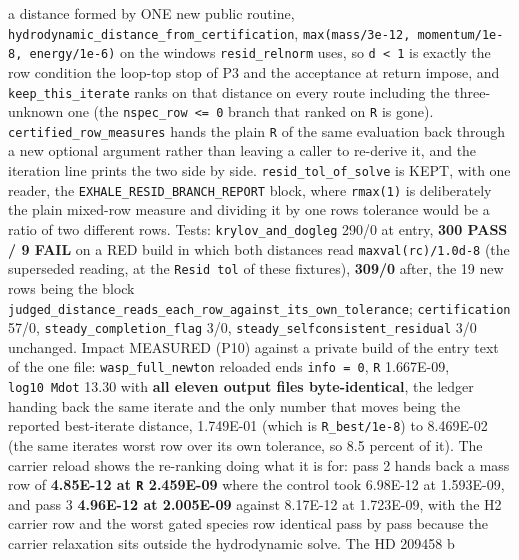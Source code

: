 \documentclass[english,a4paper]{my_memo}
\begin{document}
\begin{itemize}
  a distance formed by ONE new public routine,
  \texttt{hydrodynamic\_distance\_from\_certification}, \texttt{max(mass/3e-12,\ momentum/1e-8,\ energy/1e-6)} on the windows \texttt{resid\_relnorm} uses, so \texttt{d\ \textless{}\ 1} is exactly the
  row condition the loop-top stop of P3 and the acceptance at return impose,
  and \texttt{keep\_this\_iterate} ranks on that distance on every route including the
  three-unknown one (the \texttt{nspec\_row\ \textless{}=\ 0} branch that ranked on \texttt{\textbar{}\textbar{}R\textbar{}\textbar{}} is
  gone). \texttt{certified\_row\_measures} hands the plain \texttt{\textbar{}\textbar{}R\textbar{}\textbar{}} of the same
  evaluation back through a new optional argument rather than leaving a caller
  to re-derive it, and the iteration line prints the two side by side.
  \texttt{resid\_tol\_of\_solve} is KEPT, with one reader, the
  \texttt{EXHALE\_RESID\_BRANCH\_REPORT} block, where \texttt{rmax(1)} is deliberately the
  plain mixed-row measure and dividing it by one row\textquotesingle s tolerance would be a
  ratio of two different rows. Tests: \texttt{krylov\_and\_dogleg} 290/0 at entry,
  \textbf{300 PASS / 9 FAIL} on a RED build in which both distances read
  \texttt{maxval(rc)/1.0d-8} (the superseded reading, at the \texttt{Resid\ tol} of these
  fixtures), \textbf{309/0} after, the 19 new rows being the block
  \texttt{judged\_distance\_reads\_each\_row\_against\_its\_own\_tolerance}; \texttt{certification}
  57/0, \texttt{steady\_completion\_flag} 3/0, \texttt{steady\_selfconsistent\_residual} 3/0
  unchanged. Impact MEASURED (P10) against a private build of the entry text
  of the one file: \texttt{wasp\_full\_newton} reloaded ends \texttt{info\ =\ 0}, \texttt{\textbar{}\textbar{}R\textbar{}\textbar{}}
  1.667E-09, \texttt{log10\ Mdot} 13.30 with \textbf{all eleven output files
  byte-identical}, the ledger handing back the same iterate and the only
  number that moves being the reported best-iterate distance, 1.749E-01
  (which is \texttt{\textbar{}\textbar{}R\textbar{}\textbar{}\_best/1e-8}) to 8.469E-02 (the same iterate\textquotesingle s worst row over
  its own tolerance, so 8.5 percent of it). The carrier reload shows the
  re-ranking doing what it is for: pass 2 hands back a mass row of \textbf{4.85E-12
  at \texttt{\textbar{}\textbar{}R\textbar{}\textbar{}} 2.459E-09} where the control took 6.98E-12 at 1.593E-09, and
  pass 3 \textbf{4.96E-12 at 2.005E-09} against 8.17E-12 at 1.723E-09, with the H2
  carrier row and the worst gated species row identical pass by pass because
  the carrier relaxation sits outside the hydrodynamic solve. The HD 209458 b

\end{itemize}
\end{document}
